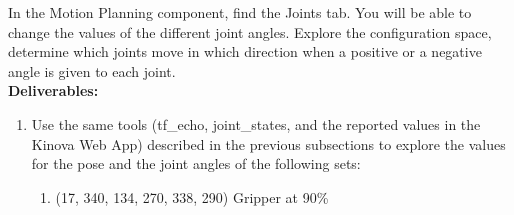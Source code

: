 \documentclass[12pt]{article}
\begin{document}
In the Motion Planning component, find the Joints tab. You will be able to change the values of the different joint angles. Explore the configuration space, determine which joints move in which direction when a positive or a negative angle is given to each joint.\\

\textbf{Deliverables:}
\begin{enumerate}
    \item Use the same tools (tf\_echo, joint\_states, and the reported values in the Kinova Web App) described in the previous subsections to explore the values for the pose and the joint angles of the following sets:
    \begin{enumerate}
        \item (17, 340, 134, 270, 338, 290) Gripper at 90\%
        

\end{enumerate}
\end{enumerate}
\end{document}

